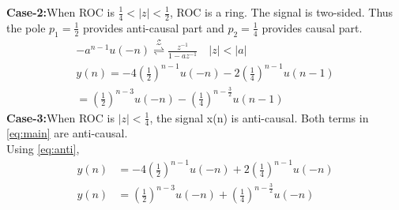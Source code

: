 \documentclass[journal,12pt,twocolumn]{IEEEtran}
\providecommand{\brak}[1]{\ensuremath{\left(#1\right)}}
\providecommand{\abs}[1]{\left\vert#1\right\vert}
\providecommand{\ztrans}{\overset{\mathcal{Z}}{ \rightleftharpoons}}
\numberwithin{equation}{section}
\begin{document}
\textbf{Case-2:}When ROC is $\frac{1}{4}<\abs{z}<\frac{1}{2}$, ROC is a ring. The signal is two-sided. Thus the pole $p_1=\frac{1}{2}$ provides anti-causal part and $p_2=\frac{1}{4}$ provides causal part.
\begin{align}
-a^{n-1}u(-n) \ztrans \frac{z^{-1}}{1-az^{-1}} \quad \abs{z} < \abs{a}\\
y(n)=-4\brak{\frac{1}{2}}^{n-1}u(-n)-2\brak{\frac{1}{4}}^{n-1}u(n-1)\\
=\brak{\frac{1}{2}}^{n-3}u(-n)-\brak{\frac{1}{4}}^{n-\frac{3}{2}}u(n-1)
\end{align}
\textbf{Case-3:}When ROC is $\abs{z}<\frac{1}{4}$, the signal x(n) is anti-causal. Both terms in \eqref{eq:main} are anti-causal.\\
Using \eqref{eq:anti},
\begin{align}
y(n)&=-4\brak{\frac{1}{2}}^{n-1}u(-n)+2\brak{\frac{1}{4}}^{n-1}u(-n)\\
y(n)&=\brak{\frac{1}{2}}^{n-3}u(-n)+\brak{\frac{1}{4}}^{n-\frac{3}{2}}u(-n)
\end{align}
\end{document}
